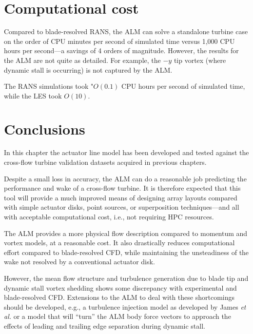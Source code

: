 

\section{Computational cost}


Compared to blade-resolved RANS, the ALM can solve a standalone turbine case on
the order of CPU minutes per second of simulated time versus 1,000 CPU hours per
second---a savings of 4 orders of magnitude. However, the results for the ALM
are not quite as detailed. For example, the $-y$ tip vortex (where dynamic stall
is occurring) is not captured by the ALM.

The RANS simulations took "$O(0.1)$ CPU hours per second of simulated time,
while the LES took $O(10)$.


\section{Conclusions}

In this chapter the actuator line model has been developed and tested against
the cross-flow turbine validation datasets acquired in previous chapters.

Despite a small loss in accuracy, the ALM can do a reasonable job predicting the
performance and wake of a cross-flow turbine. It is therefore expected that this
tool will provide a much improved means of designing array layouts compared with
simple actuator disks, point sources, or superposition techniques---and all with
acceptable computational cost, i.e., not requiring HPC resources.

The ALM provides a more physical flow description compared to momentum and
vortex models, at a reasonable cost. It also drastically reduces computational
effort compared to blade-resolved CFD, while maintaining the unsteadiness of the
wake not resolved by a conventional actuator disk.

However, the mean flow structure and turbulence generation due to blade tip and
dynamic stall vortex shedding shows some discrepancy with experimental and
blade-resolved CFD. Extensions to the ALM to deal with these shortcomings should
be developed, e.g., a turbulence injection model as developed by James \emph{et
    al.} \cite{James2010} or a model that will ``turn'' the ALM body force vectors
to approach the effects of leading and trailing edge separation during dynamic
stall.


